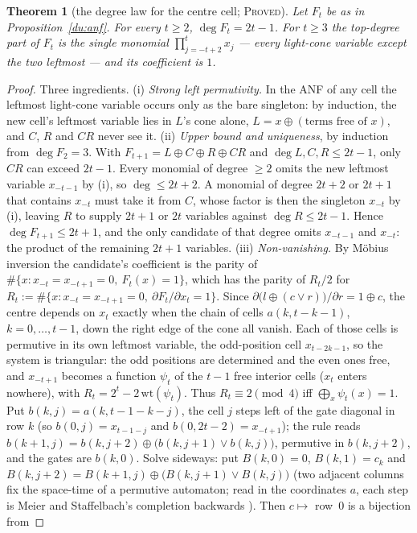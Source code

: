 \documentclass[11pt]{article}
\newtheorem{theorem}{Theorem}[section]
\theoremstyle{definition}
\theoremstyle{remark}
\newcommand{\PROVED}{\textsc{Proved}}
\begin{document}
\begin{theorem}[the degree law for the centre cell; \PROVED]\label{du:thm:degree}
Let $F_t$ be as in Proposition~\ref{du:anf}. For every $t\ge2$, $\deg F_t=2t-1$. For $t\ge3$ the
top-degree part of $F_t$ is the single monomial $\prod_{j=-t+2}^{t}x_j$ --- every light-cone variable
except the two leftmost --- and its coefficient is $1$.
\end{theorem}
\begin{proof}
Three ingredients. (i) \emph{Strong left permutivity.} In the ANF of any cell the leftmost light-cone
variable occurs only as the bare singleton: by induction, the new cell's leftmost variable lies in
$L$'s cone alone, $L=x\oplus(\text{terms free of }x)$, and $C$, $R$ and $CR$ never see it.
(ii) \emph{Upper bound and uniqueness}, by induction from $\deg F_2=3$. With $F_{t+1}=L\oplus C\oplus
R\oplus CR$ and $\deg L,C,R\le2t-1$, only $CR$ can exceed $2t-1$. Every monomial of degree $\ge2$ omits
the new leftmost variable $x_{-t-1}$ by (i), so $\deg\le2t+2$. A monomial of degree $2t+2$ or $2t+1$
that contains $x_{-t}$ must take it from $C$, whose factor is then the singleton $x_{-t}$ by (i),
leaving $R$ to supply $2t+1$ or $2t$ variables against $\deg R\le2t-1$. Hence $\deg F_{t+1}\le2t+1$,
and the only candidate of that degree omits $x_{-t-1}$ and $x_{-t}$: the product of the remaining
$2t+1$ variables. (iii) \emph{Non-vanishing.} By M\"obius inversion the candidate's coefficient is the
parity of $\#\{x:x_{-t}=x_{-t+1}=0,\ F_t(x)=1\}$, which has the parity of $R_t/2$ for
$R_t:=\#\{x:x_{-t}=x_{-t+1}=0,\ \partial F_t/\partial x_t=1\}$. Since
$\partial\bigl(l\oplus(c\vee r)\bigr)/\partial r=1\oplus c$, the centre depends on $x_t$ exactly when
the chain of cells $a(k,t-k-1)$, $k=0,\dots,t-1$, down the right edge of the cone all vanish. Each of
those cells is permutive in its own leftmost variable, the odd-position cell $x_{t-2k-1}$, so the
system is triangular: the odd positions are determined and the even ones free, and $x_{-t+1}$ becomes
a function $\psi_t$ of the $t-1$ free interior cells ($x_t$ enters nowhere), with $R_t=2^t-2\,\mathrm{wt}(\psi_t)$. Thus $R_t\equiv2\pmod4$
iff $\bigoplus_x\psi_t(x)=1$. Put $b(k,j)=a(k,t-1-k-j)$, the cell $j$ steps left of the gate diagonal in row $k$ (so $b(0,j)=x_{t-1-j}$ and $b(0,2t-2)=x_{-t+1}$); the rule reads
$b(k+1,j)=b(k,j+2)\oplus\bigl(b(k,j+1)\vee b(k,j)\bigr)$, permutive in $b(k,j+2)$, and the gates are $b(k,0)$.
Solve sideways: put $B(k,0)=0$, $B(k,1)=c_k$ and $B(k,j+2)=B(k+1,j)\oplus\bigl(B(k,j+1)\vee B(k,j)\bigr)$ (two
adjacent columns fix the space-time of a permutive automaton; read in the coordinates $a$, each step is Meier and Staffelbach's completion backwards \cite[eq.~(4)]{MS}). Then $c\mapsto$ row~$0$ is a bijection from

\end{proof}
\end{document}
